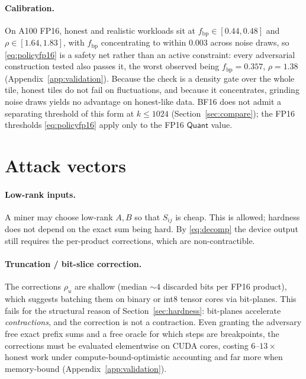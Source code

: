 \documentclass[11pt]{article}
\newcommand{\Quant}{\textsf{Quant}}
\newcommand{\FP}[1]{\textsf{FP#1}}
\begin{document}
\paragraph{Calibration.} On A100 \FP{16}, honest and realistic workloads sit at
$f_{\text{bp}}\in[0.44,0.48]$ and $\rho\in[1.64,1.83]$, with $f_{\text{bp}}$ concentrating to
within $0.003$ across noise draws, so \eqref{eq:policyfp16} is a safety net rather than an active
constraint: every adversarial construction tested also passes it, the worst observed being
$f_{\text{bp}}=0.357$, $\rho=1.38$ (Appendix~\ref{app:validation}). Because the check is a density
gate over the whole tile, honest tiles do not fail on fluctuations, and because it concentrates,
grinding noise draws yields no advantage on honest-like data. \textsf{BF16} does not admit a
separating threshold of this form at $k\le 1024$ (Section~\ref{sec:compare}); the \FP{16}
thresholds \eqref{eq:policyfp16} apply only to the \FP{16} $\Quant$ value.

\section{Attack vectors}\label{sec:attacks}

\paragraph{Low-rank inputs.} A miner may choose low-rank $A,B$ so that $S_{ij}$ is cheap. This is
allowed; hardness does not depend on the exact sum being hard. By \eqref{eq:decomp} the device
output still requires the per-product corrections, which are non-contractible.

\paragraph{Truncation / bit-slice correction.} The corrections $\rho_u$ are shallow (median
$\sim\!4$ discarded bits per \FP{16} product), which suggests batching them on binary or int8
tensor cores via bit-planes. This fails for the structural reason of Section~\ref{sec:hardness}:
bit-planes accelerate \emph{contractions}, and the correction is not a contraction. Even granting
the adversary free exact prefix sums and a free oracle for which steps are breakpoints, the
corrections must be evaluated elementwise on CUDA cores, costing $6\text{--}13\times$ honest work
under compute-bound-optimistic accounting and far more when memory-bound
(Appendix~\ref{app:validation}).
\end{document}
